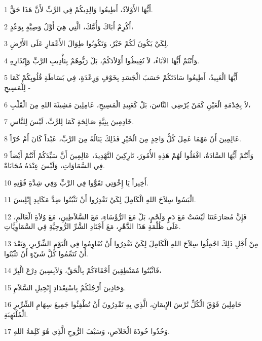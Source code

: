 \par 1 أَيُّهَا الأَوْلاَدُ، أَطِيعُوا وَالِدِيكُمْ فِي الرَّبِّ لأَنَّ هَذَا حَقٌّ.
\par 2 أَكْرِمْ أَبَاكَ وَأُمَّكَ، الَّتِي هِيَ أَوَّلُ وَصِيَّةٍ بِوَعْدٍ،
\par 3 لِكَيْ يَكُونَ لَكُمْ خَيْرٌ، وَتَكُونُوا طِوَالَ الأَعْمَارِ عَلَى الأَرْضِ.
\par 4 وَأَنْتُمْ أَيُّهَا الآبَاءُ، لاَ تُغِيظُوا أَوْلاَدَكُمْ، بَلْ رَبُّوهُمْ بِتَأْدِيبِ الرَّبِّ وَإِنْذَارِهِ.
\par 5 أَيُّهَا الْعَبِيدُ، أَطِيعُوا سَادَتَكُمْ حَسَبَ الْجَسَدِ بِخَوْفٍ وَرِعْدَةٍ، فِي بَسَاطَةِ قُلُوبِكُمْ كَمَا لِلْمَسِيحِ -
\par 6 لاَ بِخِدْمَةِ الْعَيْنِ كَمَنْ يُرْضِي النَّاسَ، بَلْ كَعَبِيدِ الْمَسِيحِ، عَامِلِينَ مَشِيئَةَ اللهِ مِنَ الْقَلْبِ،
\par 7 خَادِمِينَ بِنِيَّةٍ صَالِحَةٍ كَمَا لِلرَّبِّ، لَيْسَ لِلنَّاسِ.
\par 8 عَالِمِينَ أَنْ مَهْمَا عَمِلَ كُلُّ وَاحِدٍ مِنَ الْخَيْرِ فَذَلِكَ يَنَالُهُ مِنَ الرَّبِّ، عَبْداً كَانَ أَمْ حُرّاً.
\par 9 وَأَنْتُمْ أَيُّهَا السَّادَةُ، افْعَلُوا لَهُمْ هَذِهِ الأُمُورَ، تَارِكِينَ التَّهْدِيدَ، عَالِمِينَ أَنَّ سَيِّدَكُمْ أَنْتُمْ أَيْضاً فِي السَّمَاوَاتِ، وَلَيْسَ عِنْدَهُ مُحَابَاةٌ.
\par 10 أَخِيراً يَا إِخْوَتِي تَقَوُّوا فِي الرَّبِّ وَفِي شِدَّةِ قُوَّتِهِ.
\par 11 الْبَسُوا سِلاَحَ اللهِ الْكَامِلَ لِكَيْ تَقْدِرُوا أَنْ تَثْبُتُوا ضِدَّ مَكَايِدِ إِبْلِيسَ.
\par 12 فَإِنَّ مُصَارَعَتَنَا لَيْسَتْ مَعَ دَمٍ وَلَحْمٍ، بَلْ مَعَ الرُّؤَسَاءِ، مَعَ السَّلاَطِينِ، مَعَ وُلاَةِ الْعَالَمِ، عَلَى ظُلْمَةِ هَذَا الدَّهْرِ، مَعَ أَجْنَادِ الشَّرِّ الرُّوحِيَّةِ فِي السَّمَاوِيَّاتِ.
\par 13 مِنْ أَجْلِ ذَلِكَ احْمِلُوا سِلاَحَ اللهِ الْكَامِلَ لِكَيْ تَقْدِرُوا أَنْ تُقَاوِمُوا فِي الْيَوْمِ الشِّرِّيرِ، وَبَعْدَ أَنْ تُتَمِّمُوا كُلَّ شَيْءٍ أَنْ تَثْبُتُوا.
\par 14 فَاثْبُتُوا مُمَنْطِقِينَ أَحْقَاءَكُمْ بِالْحَقِّ، وَلاَبِسِينَ دِرْعَ الْبِرِّ،
\par 15 وَحَاذِينَ أَرْجُلَكُمْ بِاسْتِعْدَادِ إِنْجِيلِ السَّلاَمِ.
\par 16 حَامِلِينَ فَوْقَ الْكُلِّ تُرْسَ الإِيمَانِ، الَّذِي بِهِ تَقْدِرُونَ أَنْ تُطْفِئُوا جَمِيعَ سِهَامِ الشِّرِّيرِ الْمُلْتَهِبَةِ.
\par 17 وَخُذُوا خُوذَةَ الْخَلاَصِ، وَسَيْفَ الرُّوحِ الَّذِي هُوَ كَلِمَةُ اللهِ.
